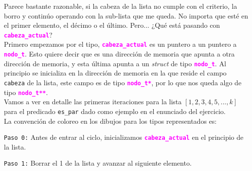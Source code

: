 \documentclass[]{scrartcl}
\newcommand{\hl}[1]{\textcolor{magenta}{\textbf{\texttt{#1}}}}
\begin{document}
Parece bastante razonable, si la cabeza de la lista no cumple con el criterio, la borro y continúo operando con la sub-lista que me queda. No importa que esté en el primer elemento, el décimo o el último. Pero... ¿Qué está pasando con \hl{cabeza\_actual}? \\

Primero empezamos por el tipo, \hl{cabeza\_actual} es un puntero a un puntero a \hl{nodo\_t}. Esto quiere decir que es una dirección de memoria que apunta a otra dirección de memoria, y esta última apunta a un \textit{struct} de tipo \hl{nodo\_t}. Al principio se inicializa en la dirección de memoria en la que reside el campo \texttt{cabeza} de la lista, este campo es de tipo \hl{nodo\_t*}, por lo que nos queda algo de tipo \hl{nodo\_t**}. \\

Vamos a ver en detalle las primeras iteraciones para la lista $[1,2,3,4,5,..., k]$ para el predicado \texttt{es\_par} dado como ejemplo en el enunciado del ejercicio. \\

La convención de coloreo en los dibujos para los tipos representados es: \\

\begin{center}
  \noindent {}
\end{center}

\newpage

\texttt{Paso 0:} Antes de entrar al ciclo, inicializamos \hl{cabeza\_actual} en el principio de la lista.

\begin{center}
  \noindent {}
\end{center}

\texttt{Paso 1:} Borrar el 1 de la lista y avanzar al siguiente elemento.
\end{document}
